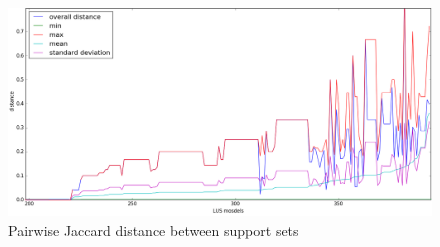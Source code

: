 
\begin{figure}
  \centering
  \includegraphics[width=\columnwidth]{figs/jacdis2.png}
  \caption{Pairwise Jaccard distance between support sets}\label{fig:jacdis}
\end{figure}



%
%

